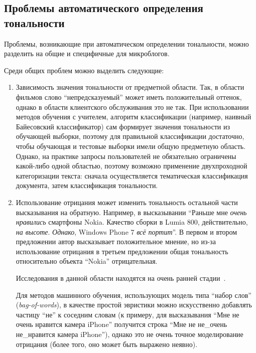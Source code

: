 \subsection{Проблемы автоматического определения тональности}

Проблемы, возникающие при автоматическом определении тональности, можно разделить на общие и специфичные для микроблогов.

\vspace{0.5cm}

Среди общих проблем можно выделить следующие:

\begin{enumerate}

\item{
	Зависимость значения тональности от предметной области. Так, в области фильмов слово ``непредсказуемый'' может иметь положительный оттенок, однако в области клиентского обслуживания это не так.
	При использовании методов обучения с учителем, алгоритм классификации (например, наивный Байесовский классификатор) сам формирует значения тональности из обучающей выборки, поэтому для правильной классификации достаточно, чтобы обучающая и тестовые выборки имели общую предметную область.
	Однако, на практике запросы пользователей не обязательно ограничены какой-либо одной областью, поэтому возможно применение двухпроходной категоризации текста: сначала осуществляется тематическая классификация документа, затем классификация тональности.
}

\item{
	Использование отрицания может изменить тональность остальной части высказывания на обратную. Например, в высказывании ``Раньше мне \textit{очень нравились} смартфоны Nokia. Качество сборки в Lumia 800, действительно, \textit{на высоте}. \textit{Однако}, Windows Phone 7 \textit{всё портит}''. В первом и втором предложении автор высказывает положительное мнение, но из-за использование отрицания в третьем предложении общая тональность относительно объекта ``Nokia'' отрицательная. 

	Исследования в данной области находятся на очень ранней стадии~\cite{negation}.
	
	Для методов машинного обучения, использующих модель типа ``набор слов'' (\textit{bag-of-words}), в качестве простой эвристики можно искусственно добавлять частицу ``не'' к соседним словам (к примеру, для высказывания ``Мне не очень нравится камера iPhone'' получится строка ``Мне не не\_очень не\_нравится камера iPhone''), однако это не очень точное моделирование отрицания (более того, оно может быть выражено неявно).	
}


\end{enumerate}
